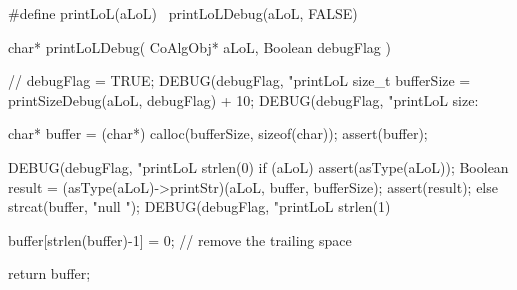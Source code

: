 #define printLoL(aLoL)      \
  printLoLDebug(aLoL, FALSE)
\stopCHeader

\startCCode
char* printLoLDebug(
  CoAlgObj* aLoL, 
  Boolean debugFlag
) {
  //  debugFlag = TRUE;
  DEBUG(debugFlag, "printLoL %
  size_t bufferSize = printSizeDebug(aLoL, debugFlag) + 10;
  DEBUG(debugFlag, "printLoL size:%

  char* buffer = (char*) calloc(bufferSize, sizeof(char));
  assert(buffer);

  DEBUG(debugFlag, "printLoL strlen(0) %
  if (aLoL) {
    assert(asType(aLoL));
    Boolean result = (asType(aLoL)->printStr)(aLoL, buffer, bufferSize);
    assert(result);
  } else strcat(buffer, "null ");
  DEBUG(debugFlag, "printLoL strlen(1) %

  buffer[strlen(buffer)-1] = 0; // remove the trailing space

  return buffer;
}
\stopCCode